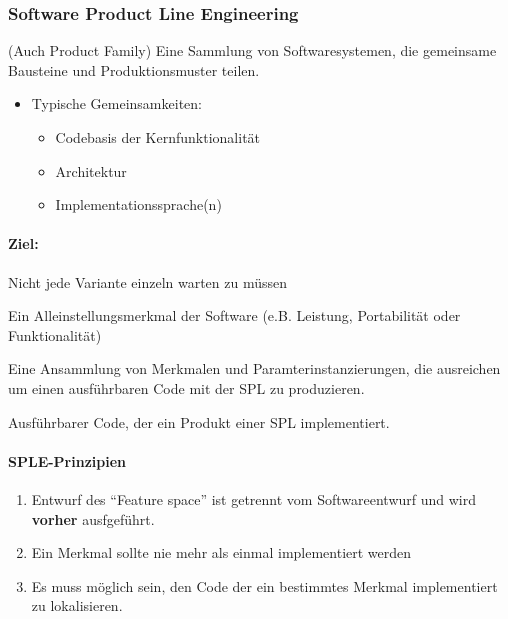 \documentclass[
    ngerman,
    color=3b,
    summary,
    boxarc,
    main,
]{rubos-tuda-template}
\begin{document}
\subsubsection{Software Product Line Engineering}
\begin{definition} (Auch Product Family)
    Eine Sammlung von Softwaresystemen, die gemeinsame Bausteine und Produktionsmuster teilen.
\end{definition}
\begin{itemize}
    \item Typische Gemeinsamkeiten:\begin{itemize}
              \item Codebasis der Kernfunktionalität
              \item Architektur
              \item Implementationssprache(n)
          \end{itemize}
\end{itemize}
\paragraph{Ziel:} Nicht jede Variante einzeln warten zu müssen
\clearpage
\begin{definition}
    Ein Alleinstellungsmerkmal der Software (e.B. Leistung, Portabilität oder Funktionalität)
\end{definition}
\begin{definition}[Produkt]
    Eine Ansammlung von Merkmalen und Paramterinstanzierungen, die ausreichen um einen ausführbaren Code mit der SPL zu produzieren.
\end{definition}
\begin{definition}
    Ausführbarer Code, der ein Produkt einer SPL implementiert.
\end{definition}

\paragraph{SPLE-Prinzipien}
\begin{enumerate}
    \item Entwurf des \enquote{Feature space} ist getrennt vom Softwareentwurf und wird \textbf{vorher} ausfgeführt.
    \item Ein Merkmal sollte nie mehr als einmal implementiert werden
    \item Es muss möglich sein, den Code der ein bestimmtes Merkmal implementiert zu lokalisieren.
\end{enumerate}
\end{document}
